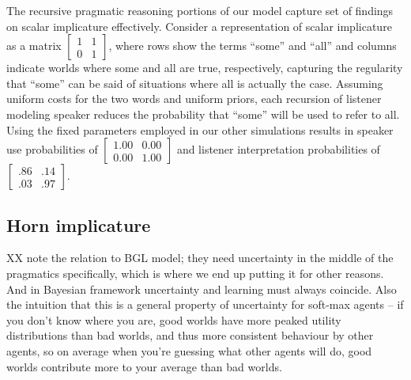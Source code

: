 \documentclass{article} %
\begin{document}
The recursive pragmatic reasoning portions of our model capture set of findings on scalar implicature effectively. Consider a representation of scalar implicature as a matrix 
$\left[
    \begin{array}{cc}
      1 & 1 \\
      0 & 1
    \end{array} 
  \right]$,
where rows show the terms ``some'' and ``all'' and columns indicate worlds where {\sc some} and {\sc all} are true, respectively, capturing the regularity that ``some'' can be said of situations where {\sc all} is actually the case. Assuming uniform costs for the two words and uniform priors, each recursion of listener modeling speaker reduces the probability that ``some'' will be used to refer to {\sc all}. Using the fixed parameters employed in our other simulations results in speaker use probabilities of 
$\left[
    \begin{array}{cc}
      1.00 & 0.00 \\
      0.00 & 1.00
    \end{array} 
  \right]$
and listener interpretation probabilities of 
$\left[
    \begin{array}{cc}
      .86 & .14 \\
      .03 & .97
    \end{array} 
  \right]$.

%
%

\subsection{Horn implicature}

XX note the relation to BGL model; they need uncertainty in the middle of the pragmatics specifically, which is where we end up putting it for other reasons. And in Bayesian framework uncertainty and learning must always coincide. Also the intuition that this is a general property of uncertainty for soft-max agents -- if you don't know where you are, good worlds have more peaked utility distributions than bad worlds, and thus more consistent behaviour by other agents, so on average when you're guessing what other agents will do, good worlds contribute more to your average than bad worlds.
\end{document}
